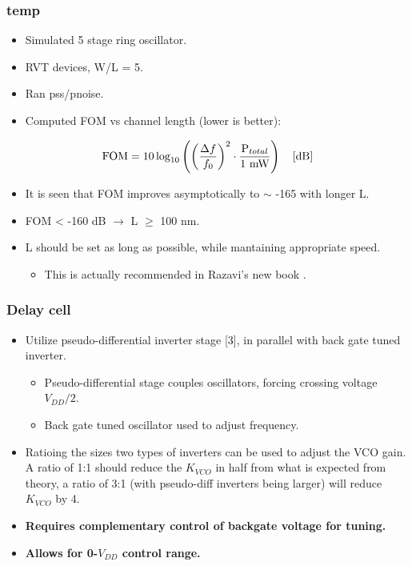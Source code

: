		\subsubsection{temp}
			\begin{itemize}[itemsep=4pt,label=\protect---]
				\item Simulated 5 stage ring oscillator.
				\item RVT devices, W/L = 5.
				\item Ran pss/pnoise.
				\item Computed FOM vs channel length (lower is better):
			\end{itemize}
				\begin{equation}
					\textnormal{FOM} = 10\log_{10}\left( \left( \frac{\Delta f}{f_0} \right)^2 \cdot\frac{\textnormal{P}_{total}}{\textnormal{1 mW}} \right)\hspace{1em} \textnormal{[dB]}
				\end{equation}
			\begin{itemize}[itemsep=4pt,label=\protect---]
				\item It is seen that FOM improves asymptotically to $\sim$ -165 with longer L.
				\item FOM < -160 dB $\rightarrow$ L $\geq$ 100 nm.
				\item L should be set as long as possible, while mantaining appropriate speed.
				\begin{itemize}[itemsep=4pt,label=$\bullet$]
					\item This is actually recommended in Razavi's new book \cite{Razavi2020}.
				\end{itemize}
			\end{itemize}



		\subsubsection{Delay cell}

			\begin{itemize}[itemsep=4pt,label=\protect---]
				\item Utilize pseudo-differential inverter stage [3], in parallel with back gate tuned inverter.
				\begin{itemize}[itemsep=4pt,label=$\bullet$]
					\item Pseudo-differential stage couples oscillators, forcing crossing voltage $V_{DD}/2$.
					\item Back gate tuned oscillator used to adjust frequency.
				\end{itemize}			
				\item Ratioing the sizes two types of inverters can be used to adjust the VCO gain. A ratio of 1:1 should reduce the $K_{VCO}$ in half from what is expected from theory, a ratio of 3:1 (with pseudo-diff inverters being larger) will reduce $K_{VCO}$ by 4. 
				\item \textbf{Requires complementary control of backgate voltage for tuning.}
				\item \textbf{\color{red}Allows for 0-$V_{DD}$ control range.	}
			\end{itemize}

